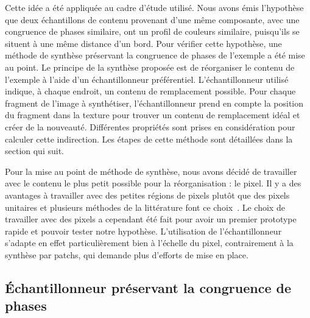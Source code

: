 \bigskip

Cette idée a été appliquée au cadre d'étude utilisé. Nous avons émis l'hypothèse que deux échantillons de contenu provenant d'une même composante, avec une congruence de phases similaire, ont un profil de couleurs similaire, puisqu'ils se situent à une même distance d'un bord. Pour vérifier cette hypothèse, une méthode de synthèse préservant la congruence de phases de l'exemple a été mise au point. Le principe de la synthèse proposée est de réorganiser le contenu de l'exemple à l'aide d'un échantillonneur préférentiel. L'échantillonneur utilisé indique, à chaque endroit, un contenu de remplacement possible. Pour chaque fragment de l'image à synthétiser, l'échantillonneur prend en compte la position du fragment dans la texture pour trouver un contenu de remplacement idéal et créer de la nouveauté. Différentes propriétés sont prises en considération pour calculer cette indirection. Les étapes de cette méthode sont détaillées dans la section qui suit.

\bigskip

Pour la mise au point de méthode de synthèse, nous avons décidé de travailler avec le contenu le plus petit possible pour la réorganisation : le pixel. Il y a des avantages à travailler avec des petites régions de pixels plutôt que des pixels unitaires et plusieurs méthodes de la littérature font ce choix~\cite{wei_state_2009}. Le choix de travailler avec des pixels a cependant été fait pour avoir un premier prototype rapide et pouvoir tester notre hypothèse. L'utilisation de l'échantillonneur s'adapte en effet particulièrement bien à l'échelle du pixel, contrairement à la synthèse par patchs, qui demande plus d'efforts de mise en place.

\subsection{Échantillonneur préservant la congruence de phases}

